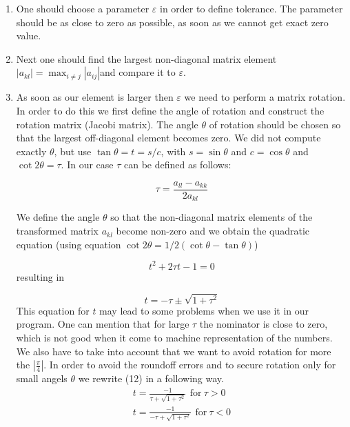 \documentclass[10pt]{article}
\begin{document}
\begin{enumerate}
\item One should choose a parameter $\varepsilon $ in order to define tolerance. The parameter should be as close to zero as possible, as soon as we cannot get exact zero value.

\item Next one should find the largest non-diagonal matrix element $\left\vert
a_{kl}\right\vert =\max\nolimits_{i\neq j}\left\vert a_{ij}\right\vert $and
compare it to $\varepsilon $. 

\item As soon as our element is larger then $\varepsilon$ we need to perform a matrix rotation. In order to do this we first define the angle of rotation and construct the rotation matrix (Jacobi matrix). The angle $\theta $ of rotation should be chosen so that the largest off-diagonal element becomes zero.
We did not compute exactly $\theta $, but use $%
\tan \theta =t=s/c$, with $s=\sin \theta $ and $c=\cos \theta $ and $\cot
2\theta =\tau $. 
In our case $\tau $ can be defined as follows:

\begin{equation}
\tau =\frac{a_{ll}-a_{kk}}{2a_{kl}}
\end{equation}%

We define the angle $\theta $ so that the non-diagonal matrix
elements of the transformed matrix $a_{kl}$ become non-zero and we obtain
the quadratic equation (using equation $\cot 2\theta =1/2(\cot \theta -\tan \theta )$)

\begin{equation}
t^{2}+2\tau t-1=0
\end{equation}
resulting in

\begin{equation}
t=-\tau \pm \sqrt{1+\tau ^{2}}
\end{equation}
This equation for $ t $ may lead to some problems when we use it in our program. One can mention that for large $ \tau $ the nominator is close to zero, which is not good when it come to machine representation of the numbers. We also have to take into account that we want to avoid rotation for more the $ |\frac{\pi}{4}|$. In order to avoid the roundoff errors  and to secure rotation only for small angels $ \theta $ we rewrite (12) in a following way.
\begin{gather*}
t=\frac{-1}{\tau+\sqrt{1+\tau^{2}}}\,\ \text{for} \  \tau>0 \\
t=\frac{-1}{-\tau+\sqrt{1+\tau^{2}}}\,\ \text{for} \ \tau<0
\end{gather*}



\end{enumerate}
\end{document}
